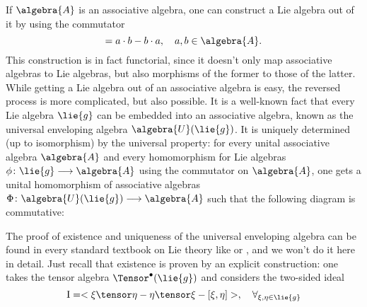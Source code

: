 If $\algebra{A}$ is an associative algebra, one can construct a Lie algebra 
out of it by using the commutator
\begin{equation*}
	[a,b]
	=
	a \cdot b - b \cdot a
	, \quad
	a,b \in \algebra{A}.
\end{equation*}
This construction is in fact functorial, since it doesn't only map associative 
algebras to Lie algebras, but also morphisms of the former to those of the 
latter. While getting a Lie algebra out of an associative algebra is easy, the 
reversed process is more complicated, but also possible. It is a well-known 
fact that every Lie algebra $\lie{g}$ can be embedded into an associative 
algebra, known as the universal enveloping algebra $\algebra{U}(\lie{g})$. It 
is uniquely determined (up to isomorphism) by the universal property: for 
every unital associative algebra $\algebra{A}$ and every homomorphism for Lie 
algebras $\phi\colon \lie{g} \longrightarrow \algebra{A}$ using the 
commutator on $\algebra{A}$, one gets a unital homomorphism of associative 
algebras $\Phi \colon \algebra{U}(\lie{g}) \longrightarrow \algebra{A}$ such 
that the following diagram is commutative:
\begin{center}
\end{center}
The proof of existence and uniqueness of the universal enveloping algebra can 
be found in every standard textbook on Lie theory like 
\cite{hilgert.neeb:2012a} or \cite{varadarajan:1971a}, and we won't do it here 
in detail. Just recall that existence is proven by an explicit construction: 
one takes the tensor algebra $\Tensor^{\bullet}(\lie{g})$ and considers the 
two-sided ideal
\begin{equation*}
	\mathrm{I}
	=
	< \xi \tensor \eta - \eta \tensor \xi - [\xi, \eta] >
	, \quad
	\forall_{\xi, \eta \in \lie{g}}
\end{equation*}
